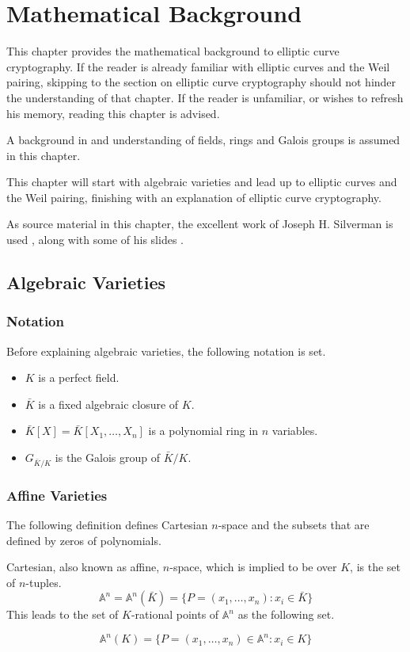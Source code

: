 \chapter{Mathematical Background}
This chapter provides the mathematical background to elliptic curve cryptography. If the reader is already familiar with elliptic curves and the Weil pairing, skipping to the section on elliptic curve cryptography should not hinder the understanding of that chapter. If the reader is unfamiliar, or wishes to refresh his memory, reading this chapter is advised.

A background in and understanding of fields, rings and Galois groups is assumed in this chapter.

This chapter will start with algebraic varieties and lead up to elliptic curves and the Weil pairing, finishing with an explanation of elliptic curve cryptography.

As source material in this chapter, the excellent work of Joseph H. Silverman is used \cite[Chapter 1-3]{EllipticCurvesBook}, along with some of his slides \cite{EllipticCurvesSlides}.

\section{Algebraic Varieties}
\subsection{Notation}
Before explaining algebraic varieties, the following notation is set.
\begin{itemize}
	\item $K$ is a perfect field.
	\item $\bar{K}$ is a fixed algebraic closure of $K$.
	\item $\bar{K}[X]=\bar{K}[X_1,\dots,X_n]$ is a polynomial ring in $n$ variables.
	\item $G_{\bar{K}/K}$ is the Galois group of $\bar{K}/K$.
\end{itemize}

\subsection{Affine Varieties}
The following definition defines Cartesian $n$-space and the subsets that are defined by zeros of polynomials.
\begin{defn}
	Cartesian, also known as affine, $n$-space, which is implied to be over $K$, is the set of $n$-tuples.
	\begin{equation*}
	\mathbb{A}^n=\mathbb{A}^n(\bar{K})=\{P=(x_1,\dots,x_n):x_i\in\bar{K}\}
	\end{equation*}
	This leads to the set of $K$-rational points of $\mathbb{A}^n$ as the following set.
	
	\begin{equation*}\mathbb{A}^n(K)=\{P=(x_1,\dots,x_n)\in\mathbb{A}^n:x_i\in K\}
	\end{equation*}
\end{defn}

